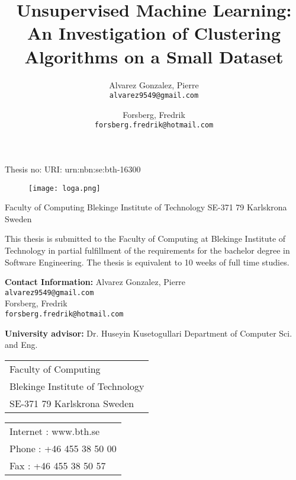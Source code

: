 \documentclass[a4paper]{article}
\title{Unsupervised Machine Learning: An Investigation of Clustering Algorithms on a Small Dataset \newline}
\author{
	Alvarez Gonzalez, Pierre \\
	\texttt{alvarez9549@gmail.com}
%
	\and 
%	
	Forsberg, Fredrik \\
	\texttt{forsberg.fredrik@hotmail.com}}
\date{}
\begin{document}
\begin{flushleft}
Thesis no: \newline
URI:  urn:nbn:se:bth-16300
\end{flushleft}
{\let\newpage\relax\maketitle}

\begin{figure}[bh]
\texttt{[image: loga.png]}
\centering
\end{figure}


\vfill
\begin{flushleft}
Faculty of Computing\newline
Blekinge Institute of Technology\newline
SE-371 79 Karlskrona Sweden
\end{flushleft}




\newpage

This thesis is submitted to the Faculty of Computing at Blekinge Institute of Technology in partial fulfillment of the requirements for the bachelor degree in Software Engineering. The thesis is equivalent to 10 weeks of full time studies.

\vfill
\begin{flushleft}
\textbf{Contact Information:}\newline
Alvarez Gonzalez, Pierre \\
	\texttt{alvarez9549@gmail.com}
\\Forsberg, Fredrik \\
	\texttt{forsberg.fredrik@hotmail.com}\\

\end{flushleft}

\vfill
\begin{flushleft}
\textbf{University advisor:}\newline
Dr. Huseyin Kusetogullari\newline
% 
% 
Department of Computer Sci. and Eng.\newline
\end{flushleft}

\vfill\noindent
\begin{tabular}[t]{@{}l} 
  	Faculty of Computing\\
	Blekinge Institute of Technology\\
	SE-371 79 Karlskrona Sweden\\
\end{tabular}
\hfill%
\begin{tabular}[t]{l@{}}
	Internet	: www.bth.se\\
	Phone	: +46 455 38 50 00\\
	Fax	: +46 455 38 50 57
\end{tabular}
\end{document}
